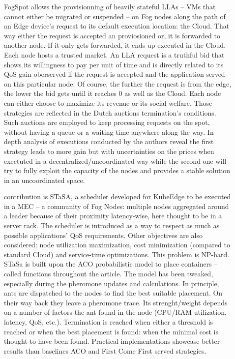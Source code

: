 \documentclass[11pt]{sdm}
\begin{document}
\begin{description}
	\item[] FogSpot allows the provisionning of heavily stateful \glspl{LLA} -- \glspl{VM} that cannot either be migrated or suspended -- on Fog nodes along the path of an Edge device's request to its default execution location: the Cloud. That way either the request is accepted an proviosioned or, it is forwarded to another node. If it only gets forwarded, it ends up executed in the Cloud. 
	Each node hosts a trusted market. An \gls{LLA} request is a truthful bid that shows its willingness to pay per unit of time and is directly related to its \gls{QoS} gain oberserved if the request is accepted and the application served on this particular node. Of course, the further the request is from the edge, the lower the bid gets until it reaches 0 as well as the Cloud.
	Each node can either choose to maximize its revenue or its social welfare. Those strategies are reflected in the Dutch auctions termination's conditions. Such auctions are employed to keep processing requests on the spot, without having a queue or a waiting time anywhere along the way. In depth analysis of executions conducted by the authors reveal the first strategy leads to more gain but with uncertainties on the prices when exectuted in a decentralized/uncoordinated way while the second one will try to fully exploit the capacity of the nodes and provides a stable solution in an uncoordinated space.
	
	\item[] contribution is STaSA, a scheduler developed for KubeEdge to be executed in a \gls{MEC} -- a community of Fog Nodes: multiple nodes aggregated around a leader because of their proximity latency-wise, here thought to be in a server rack. The scheduler is introduced as a way to respect as much as possible applications' \gls{QoS} requirements. Other objectives are also considered: node utilization maximization, cost minimization (compared to standard Cloud) and service-time optimizations. This problem is NP-hard. STaSa is built upon the \gls{ACO} probabilistic model to place containers -- called functions throughout the article. The model has been tweaked, especially during the pheromone updates and calculations. In principle, ants are dispatched to the nodes to find the best suitable placement. On their way back they leave a pheromone trace. Its strenght/weight depends on a number of factors the ant found in the node (CPU/RAM utilization, latency, QoS, etc.). Termination is reached when either a threshold is reached or when the best placement is found: when the minimal cost is thought to have been found. Practical implementations showcase better results than baselines \gls{ACO} and First Come First served strategies.
	

\end{description}
\end{document}
